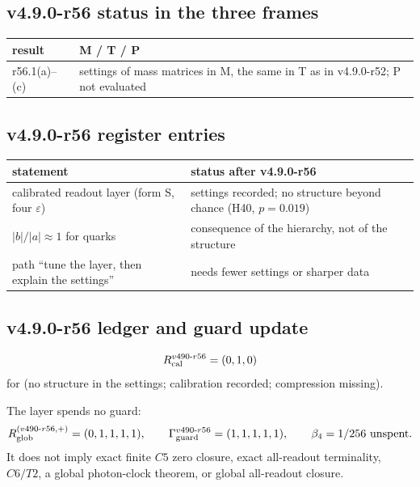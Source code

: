 \subsection*{v4.9.0-r56 status in the three frames}
\label{subsec:v490-r56-frames}

\begin{center}
\small
\begin{tabular}{@{}>{\raggedright\arraybackslash}p{}>{\raggedright\arraybackslash}p{}@{}}
\toprule
result & M / T / P\\
\midrule
r56.1(a)--(c) & settings of mass matrices in M, the same in T as in v4.9.0-r52; P not evaluated\\
\bottomrule
\end{tabular}
\end{center}

\subsection*{v4.9.0-r56 register entries}
\label{subsec:v490-r56-register}

\begin{center}
\small
\begin{tabular}{@{}>{\raggedright\arraybackslash}p{}>{\raggedright\arraybackslash}p{}@{}}
\toprule
statement & status after v4.9.0-r56\\
\midrule
calibrated readout layer (form S, four \(\varepsilon\)) & settings recorded; no structure beyond chance (H40, \(p=0.019\))\\
\(|b|/|a|\approx1\) for quarks & consequence of the hierarchy, not of the structure\\
path ``tune the layer, then explain the settings'' & needs fewer settings or sharper data\\
\bottomrule
\end{tabular}
\end{center}

\subsection*{v4.9.0-r56 ledger and guard update}
\label{subsec:v490-r56-ledger-guard}

\[
R_{\rm cal}^{v490\text{-}r56}=(0,1,0)
\]
for (no structure in the settings; calibration recorded; compression missing).

The layer spends no guard:
\[
R_{\rm glob}^{(v490\text{-}r56,+)}=(0,1,1,1,1),
\qquad
\Gamma_{\rm guard}^{v490\text{-}r56}=(1,1,1,1,1),
\qquad
\beta_4=1/256\ \text{unspent}.
\]
It does not imply exact finite \(C5\) zero closure, exact all-readout terminality,
\(C6/T2\), a global photon-clock theorem, or global all-readout closure.

